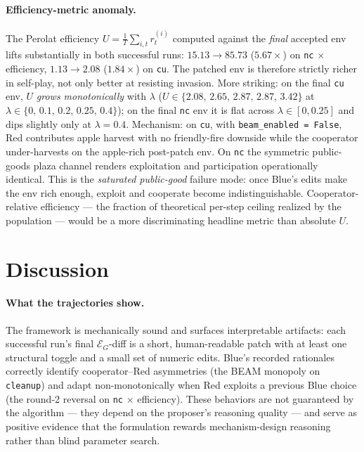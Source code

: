 \documentclass[11pt]{article}
\newcommand{\Egram}{\mathcal{E}_G}
\begin{document}
\paragraph{Efficiency-metric anomaly.}
The Perolat efficiency $U = \tfrac{1}{T}\sum_{i,t} r_t^{(i)}$
computed against the \emph{final} accepted env lifts substantially
in both successful runs: $15.13 \to 85.73$ ($5.67\times$) on
\texttt{nc} $\times$ efficiency, $1.13 \to 2.08$ ($1.84\times$) on
\texttt{cu}.  The patched env is therefore strictly richer in
self-play, not only better at resisting invasion.  More striking:
on the final \texttt{cu} env, $U$ \emph{grows monotonically} with
$\lambda$ ($U \in \{2.08,\, 2.65,\, 2.87,\, 2.87,\, 3.42\}$ at
$\lambda \in \{0,\, 0.1,\, 0.2,\, 0.25,\, 0.4\}$); on the final
\texttt{nc} env it is flat across $\lambda \in [0, 0.25]$ and
dips slightly only at $\lambda = 0.4$.  Mechanism: on
\texttt{cu}, with \texttt{beam\_enabled = False}, Red contributes
apple harvest with no friendly-fire downside while the cooperator
under-harvests on the apple-rich post-patch env.  On \texttt{nc}
the symmetric public-goods plaza channel renders exploitation and
participation operationally identical.  This is the
\emph{saturated public-good} failure mode: once Blue's edits make
the env rich enough, exploit and cooperate become
indistinguishable.  Cooperator-relative efficiency — the fraction
of theoretical per-step ceiling realized by the population —
would be a more discriminating headline metric than absolute $U$.

\section{Discussion}
\label{sec:discussion}

\paragraph{What the trajectories show.}
The framework is mechanically sound and surfaces interpretable
artifacts: each successful run's final $\Egram$-diff is a short,
human-readable patch with at least one structural toggle and a
small set of numeric edits.  Blue's recorded rationales correctly
identify cooperator–Red asymmetries (the BEAM monopoly on
\texttt{cleanup}) and adapt non-monotonically when Red exploits a
previous Blue choice (the round-2 reversal on \texttt{nc} $\times$
efficiency).  These behaviors are not guaranteed by the algorithm
— they depend on the proposer's reasoning quality — and serve as
positive evidence that the formulation rewards mechanism-design
reasoning rather than blind parameter search.
\end{document}
